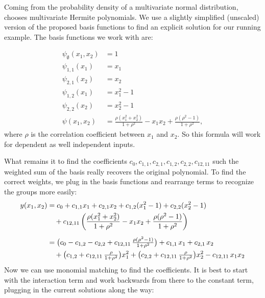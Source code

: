 Coming from the probability density of a multivariate normal distribution, \cite{rahman2014} chooses multivariate Hermite polynomials. We use a slightly simplified (unscaled) version of the proposed basis functions to find an explicit solution for our running example. The basis functions we work with are:

\begin{align*}
\psi_{\emptyset}(x_1,x_2) &= 1 \\[3pt]
\psi_{1,1}(x_1) &= x_1 \\[3pt]
\psi_{2,1}(x_2) &= x_2 \\[3pt]
\psi_{1,2}(x_1) &= x_1^2 - 1 \\[3pt]
\psi_{2,2}(x_2) &= x_2^2 - 1 \\[3pt]
\psi(x_1,x_2) &= \frac{\rho (x_1^2 + x_2^2)}{1 + \rho^2} - x_1 x_2 
+ \frac{\rho(\rho^2 - 1)}{1 + \rho^2},
\end{align*}
where $\rho$ is the correlation coefficient between $x_1$ and $x_2$. So this formula will work for dependent as well independent inputs.\par
What remains it to find the coefficients $c_0, c_{1,1}, c_{2,1}, c_{1,2}, c_{2,2}, c_{12, 11}$ such the weighted sum of the basis really recovers the original polynomial.
To find the correct weights, we plug in the basis functions and rearrange terms to recognize the groups more easily:
\begin{align*}
y(x_1,x_2) &= c_0 + c_{1,1} x_1 + c_{2,1} x_2 
+ c_{1,2}(x_1^2 - 1) + c_{2,2}(x_2^2 - 1) \notag \\ 
&\quad + c_{12, 11}\left( \frac{\rho(x_1^2 + x_2^2)}{1 + \rho^2} 
- x_1 x_2 
+ \frac{\rho(\rho^2 - 1)}{1 + \rho^2} \right) \\[5pt]
&= 
\big( c_0 - c_{1,2} - c_{2,2} + c_{12, 11}\,\tfrac{\rho(\rho^2 - 1)}{1+\rho^2} \big)
+ c_{1,1}\,x_1 
+ c_{2,1}\,x_2 \notag \\ 
&\quad + \big( c_{1,2} + c_{12, 11}\,\tfrac{\rho}{1+\rho^2} \big) x_1^2
+ \big( c_{2,2} + c_{12, 11}\,\tfrac{\rho}{1+\rho^2} \big) x_2^2
- c_{12, 11}\, x_1 x_2
\end{align*}
Now we can use monomial matching to find the coefficients. It is best to start with the interaction term and work backwards from there to the constant term, plugging in the current solutions along the way:
